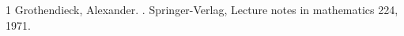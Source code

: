 \begin{thebibliography}{1}
Grothendieck, Alexander.
.
\newblock Springer-Verlag, Lecture notes in mathematics 224, 1971.
\end{thebibliography}
